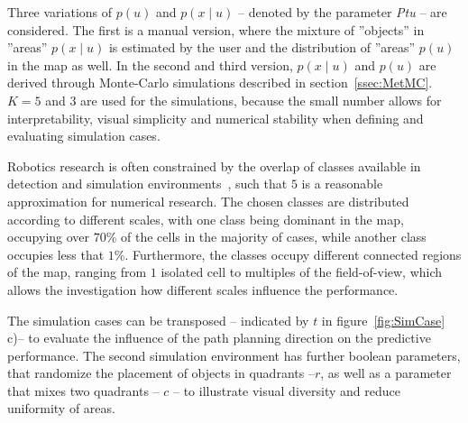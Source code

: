 \documentclass[twocolumn,letterpaper]{IEEEAerospaceCLS}  %
\begin{document}
Three variations of $p(u)$ and $p(x\mid u)$ -- denoted by the parameter \emph{Ptu} -- are considered. The first is a manual version, where the mixture of ''objects'' in ''areas'' $p(x\mid u)$ is estimated by the user and the distribution of ''areas'' $p(u)$ in the map as well. In the second and third version, $p(x\mid u)$ and $p(u)$ are derived through Monte-Carlo simulations described in section~\ref{ssec:MetMC}. $K=5$ and $3$ are used for the simulations, because the small number allows for interpretability, visual simplicity and numerical stability when defining and evaluating simulation cases.

Robotics research is often constrained by the overlap of classes available in detection and simulation environments~\cite{chaplot_object_2020}, such that $5$ is a reasonable approximation for numerical research. The chosen classes are distributed according to different scales, with one class being dominant in the map, occupying over $70$\% of the cells in the majority of cases, while another class occupies less that $1$\%. Furthermore, the classes occupy different connected regions of the map, ranging from $1$ isolated cell to multiples of the field-of-view, which allows the investigation how different scales influence the performance.

The simulation cases can be transposed -- indicated by $t$ in figure~\ref{fig:SimCase} c)-- to evaluate the influence of the path planning direction on the predictive performance. The second simulation environment has further boolean parameters, that randomize the placement of objects in quadrants --$r$, as well as a parameter that mixes two quadrants -- $c$ -- to illustrate visual diversity and reduce uniformity of areas.
\end{document}
